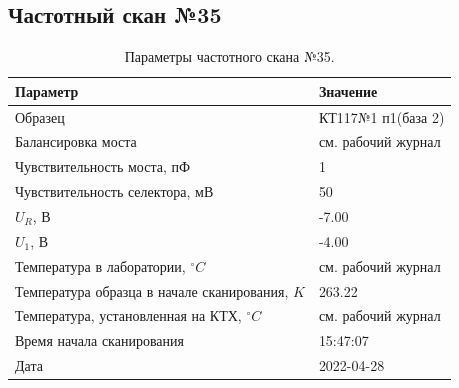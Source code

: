 \subsection{Частотный скан №35}
\begin{table}[!ht]
    \centering
    \caption{Параметры частотного скана №35.}
    \begin{tabular}{|l|l|}
        \hline
        Параметр                                       & Значение                  \\ \hline
        Образец                                        & КТ117№1 п1(база 2)        \\ \hline
        Балансировка моста                             & см. рабочий журнал        \\ \hline
        Чувствительность моста, пФ                     & 1                         \\ \hline
        Чувствительность селектора, мВ                 & 50                        \\ \hline
        $U_R$, В                                       & -7.00                     \\ \hline
        $U_1$, В                                       & -4.00                     \\ \hline
        Температура в лаборатории, $^\circ C$          & см. рабочий журнал        \\ \hline
        Температура образца в начале сканирования, $K$ & 263.22                    \\ \hline
        Температура, установленная на КТХ, $^\circ C$  & см. рабочий журнал        \\ \hline
        Время начала сканирования                      & 15:47:07                  \\ \hline
        Дата                                           & 2022-04-28                \\ \hline
    \end{tabular}
    \label{table:frequency_scan_35}
\end{table}

